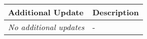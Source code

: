 \begin{table}[!h]
    \centering
    \begin{tabularx}{\textwidth}{|l|X|}
        \hline
        Additional Update & Description \\
        \hline
        \hline
        \textit{No additional updates} & 
        - \\
        \hline
    \end{tabularx}
\end{table}
